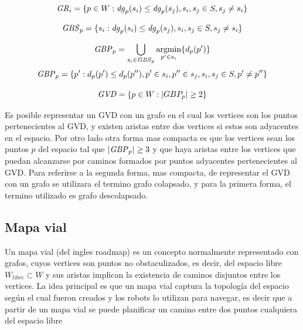 \begin{equation}
  \mathit{GR}_i = \{p \in W : \mathit{dg}_p(s_i) \leq \mathit{dg}_p(s_j), s_i,s_j\in S,s_j \neq s_i\}\label{eq:GR}
\end{equation}

\begin{equation}
  \mathit{GBS}_p = \{s_i : \mathit{dg}_p(s_i) \leq \mathit{dg}_p(s_j), s_i,s_j\in S,s_j \neq s_i\}\label{eq:GBS}
\end{equation}

\begin{equation}
  \mathit{GBP}_p =\bigcup_{s_i \in \mathit{GBS}_p} \operatorname*{argmin}_{p'\in s_i}\{d_p(p')\}\label{eq:GBP}
\end{equation}
\begin{equation}
  \mathit{GBP}_p =\{p' : d_p(p') \leq d_p(p''), p' \in s_i, p'' \in s_j, s_i,s_j \in S,p' \neq p''\}
\end{equation}

\begin{equation}
  \mathit{GVD}  = \{p \in W : |GBP_p| \geq 2\}\label{eq:GVD}
\end{equation}


Es posible representar un GVD con un grafo en el cual los vertices son los puntos pertenecientes al GVD, y existen aristas entre dos vertices si estos son adyacentes en el espacio. Por otro lado otra forma mas compacta es que los vertices sean los puntos $p$ del espacio tal que $|\mathit{GBP}_p|\geq 3$ y que haya aristas entre los vertices que puedan alcanzarse por caminos formados por puntos adyacentes pertenecientes al GVD. Para referirse a la segunda forma, mas compacta, de representar el GVD con un grafo se utilizara el termino grafo colapsado, y para la primera forma, el termino utilizado es grafo descolapsado.

\subsection{Mapa vial}\cite{choset2005principles}
Un mapa vial (del ingles roadmap) es un concepto normalmente representado con grafos, cuyos vertices son puntos no obstaculizados, es decir, del espacio libre $W_{libre} \subset W$ y sus aristas implican la existencia de caminos disjuntos entre los vertices. La idea principal es que un mapa vial captura la topología del espacio según el cual fueron creados y los robots lo utilizan para navegar, es decir que a partir de un mapa vial se puede planificar un camino entre dos puntos cualquiera del espacio libre 

